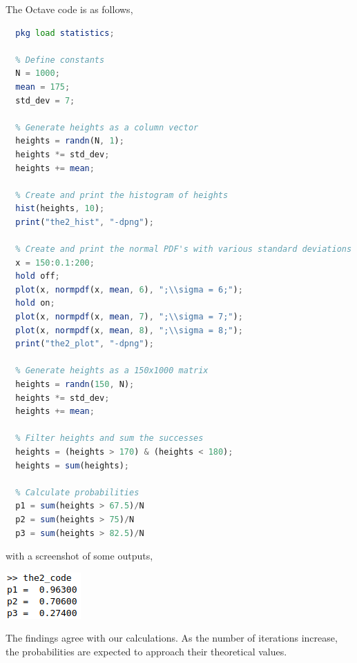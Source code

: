 \documentclass[12pt]{article}
\begin{document}
\newpage

\noindent
The Octave code is as follows,
\begin{lstlisting}[language=Octave]
  % Load statistics module for normal probability density function
  pkg load statistics;

  % Define constants
  N = 1000;
  mean = 175;
  std_dev = 7;

  % Generate heights as a column vector
  heights = randn(N, 1);
  heights *= std_dev;
  heights += mean;

  % Create and print the histogram of heights
  hist(heights, 10);
  print("the2_hist", "-dpng");

  % Create and print the normal PDF's with various standard deviations
  x = 150:0.1:200;
  hold off;
  plot(x, normpdf(x, mean, 6), ";\\sigma = 6;");
  hold on;
  plot(x, normpdf(x, mean, 7), ";\\sigma = 7;");
  plot(x, normpdf(x, mean, 8), ";\\sigma = 8;");
  print("the2_plot", "-dpng");

  % Generate heights as a 150x1000 matrix
  heights = randn(150, N);
  heights *= std_dev;
  heights += mean;

  % Filter heights and sum the successes
  heights = (heights > 170) & (heights < 180);
  heights = sum(heights);

  % Calculate probabilities
  p1 = sum(heights > 67.5)/N
  p2 = sum(heights > 75)/N
  p3 = sum(heights > 82.5)/N
\end{lstlisting}

\noindent
with a screenshot of some outputs,

\begin{center}
  \includegraphics[scale = 1]{the2_outputs.png}
\end{center}

The findings agree with our calculations. As the number of iterations increase, the probabilities are expected to approach their theoretical values.
\end{document}
